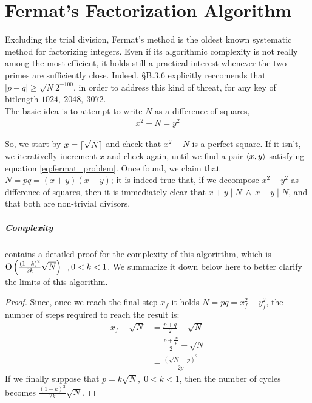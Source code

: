 \chapter{Fermat's Factorization Algorithm \label{chap:fermat}}

Excluding the trial division, Fermat's method is the oldest known systematic
method for factorizing integers. Even if its algorithmic complexity is not
really among the most efficient, it holds still a practical interest whenever
the two primes are sufficiently close.
Indeed, \cite{DSS2009} \S B.3.6 explicitly reccomends that $|p-q| \geq \sqrt{N}2^{-100}$,
in order to address this kind of threat, for any key of bitlength $1024,\ 2048,\ 3072$.\\
The basic idea is to attempt to write $N$ as a difference of squares,
\begin{align}
\label{eq:fermat_problem}
x^2 - N = y^2
\end{align}

So, we start by $x = \lceil\sqrt{N}\rceil$ and check that $x^2-N$ is a perfect
square. If it isn't, we iterativelly increment $x$ and check again, until we
find a pair $\langle x, y\rangle$ satisfying equation \ref{eq:fermat_problem}.
Once found, we claim that $N = pq = (x+y)(x-y)$; it is indeed true that, if we
decompose $x^2 - y^2$ as difference of squares, then it is immediately clear
that $x+y \mid N \ \land \  x-y \mid N$, and that both are non-trivial
divisors.

\paragraph{Complexity} \cite{riesel} contains a detailed proof for the
complexity of this algorirthm, which is
$\operatorname{O}\left(\frac{(1-k)^2}{2k} \sqrt{N}\right) \;\;,  0 < k < 1$. We summarize it down
below here to better clarify the limits of this algorithm.

\begin{proof}
  Since, once we reach the final step $x_f$ it holds $N = pq = x_f^2 - y_f^2$,
  the number of steps required to reach the result is:
  \begin{align*}
    x_f - \sqrt{N} &= \frac{p + q}{2} - \sqrt{N} \\
                   &= \frac{p + \frac{N}{p}}{2} - \sqrt{N} \\
                   &= \frac{(\sqrt{N} - p)^2}{2p}
  \end{align*}
  If we finally suppose that $p = k\sqrt{N}, \; 0 < k < 1$, then the number of cycles
  becomes
  $\frac{(1-k)^2}{2k} \sqrt{N}$.
\end{proof}

